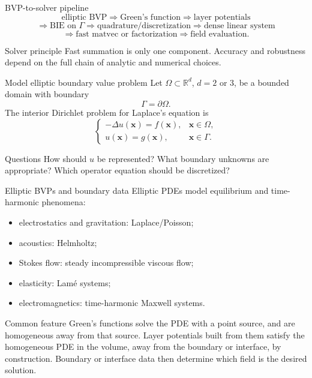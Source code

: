 \documentclass[aspectratio=169,11pt]{beamer}
\newcommand{\R}{\mathbb{R}}
\newcommand{\x}{\bm{x}}
\begin{document}
\begin{frame}{BVP-to-solver pipeline}
\small
\[
\boxed{\text{elliptic BVP}}
\Rightarrow
\boxed{\text{Green's function}}
\Rightarrow
\boxed{\text{layer potentials}}
\]
\[
\Rightarrow
\boxed{\text{BIE on }\Gamma}
\Rightarrow
\boxed{\text{quadrature/discretization}}
\Rightarrow
\boxed{\text{dense linear system}}
\]
\[
\Rightarrow
\boxed{\text{fast matvec or factorization}}
\Rightarrow
\boxed{\text{field evaluation}}.
\]

\begin{block}{Solver principle}
Fast summation is only one component. Accuracy and robustness depend on the
full chain of analytic and numerical choices.
\end{block}
\end{frame}

\begin{frame}{Model elliptic boundary value problem}
\small
Let $\Omega\subset\R^d$, $d=2$ or $3$, be a bounded domain with boundary
\[
  \Gamma=\partial\Omega.
\]
The interior Dirichlet problem for Laplace's equation is
\[
\begin{cases}
  -\Delta u(\x)=f(\x), & \x\in\Omega,\\
  u(\x)=g(\x), & \x\in\Gamma.
\end{cases}
\]

\begin{block}{Questions}
How should $u$ be represented? What boundary unknowns are appropriate? Which
operator equation should be discretized?
\end{block}
\end{frame}

\begin{frame}{Elliptic BVPs and boundary data}
\small
Elliptic PDEs model equilibrium and time-harmonic phenomena:
\begin{itemize}
  \item electrostatics and gravitation: Laplace/Poisson;
  \item acoustics: Helmholtz;
  \item Stokes flow: steady incompressible viscous flow;
  \item elasticity: Lam\'e systems;
  \item electromagnetics: time-harmonic Maxwell systems.
\end{itemize}

\begin{block}{Common feature}
Green's functions solve the PDE with a point source, and are homogeneous away
from that source. Layer potentials built from them satisfy the homogeneous PDE
in the volume, away from the boundary or interface, by construction. Boundary
or interface data then determine which field is the desired solution.
\end{block}
\end{frame}
\end{document}
